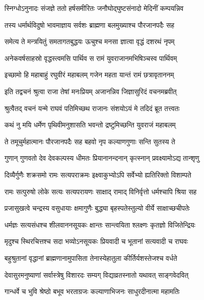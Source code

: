 \twolineshloka
{स्निग्धोऽनुनादः संजज्ञे ततो हर्षसमीरितः}
{जनौघोद्घुष्टसंनादो मेदिनीं कम्पयन्निव} %

\twolineshloka
{तस्य धर्मार्थविदुषो भावमाज्ञाय सर्वशः}
{ब्राह्मणा बलमुख्याश्च पौरजानपदैः सह} %

\twolineshloka
{समेत्य ते मन्त्रयितुं समतागतबुद्धयः}
{ऊचुश्च मनसा ज्ञात्वा वृद्धं दशरथं नृपम्} %

\twolineshloka
{अनेकवर्षसाहस्रो वृद्धस्त्वमसि पार्थिव}
{स रामं युवराजानमभिषिञ्चस्व पार्थिवम्} %

\twolineshloka
{इच्छामो हि महाबाहुं रघुवीरं महाबलम्}
{गजेन महता यान्तं रामं छत्रावृताननम्} %

\twolineshloka
{इति तद्वचनं श्रुत्वा राजा तेषां मनःप्रियम्}
{अजानन्निव जिज्ञासुरिदं वचनमब्रवीत्} %

\twolineshloka
{श्रुत्वैतद् वचनं यन्मे राघवं पतिमिच्छथ}
{राजानः संशयोऽयं मे तदिदं ब्रूत तत्त्वतः} %

\twolineshloka
{कथं नु मयि धर्मेण पृथिवीमनुशासति}
{भवन्तो द्रष्टुमिच्छन्ति युवराजं महाबलम्} %

\twolineshloka
{ते तमूचुर्महात्मानः पौरजानपदैः सह}
{बहवो नृप कल्याणगुणाः सन्ति सुतस्य ते} %

\twolineshloka
{गुणान् गुणवतो देव देवकल्पस्य धीमतः}
{प्रियानानन्दनान् कृत्स्नान् प्रवक्ष्यामोऽद्य तान्शृणु} %

\twolineshloka
{दिव्यैर्गुणैः शक्रसमो रामः सत्यपराक्रमः}
{इक्ष्वाकुभ्योऽपि सर्वेभ्यो ह्यतिरिक्तो विशाम्पते} %

\twolineshloka
{रामः सत्पुरुषो लोके सत्यः सत्यपरायणः}
{साक्षाद् रामाद् विनिर्वृत्तो धर्मश्चापि श्रिया सह} %

\twolineshloka
{प्रजासुखत्वे चन्द्रस्य वसुधायाः क्षमागुणैः}
{बुद्ध्या बृहस्पतेस्तुल्यो वीर्ये साक्षाच्छचीपतेः} %

\twolineshloka
{धर्मज्ञः सत्यसंधश्च शीलवाननसूयकः}
{क्षान्तः सान्त्वयिता श्लक्ष्णः कृतज्ञो विजितेन्द्रियः} %

\twolineshloka
{मृदुश्च स्थिरचित्तश्च सदा भव्योऽनसूयकः}
{प्रियवादी च भूतानां सत्यवादी च राघवः} %

\twolineshloka
{बहुश्रुतानां वृद्धानां ब्राह्मणानामुपासिता}
{तेनास्येहातुला कीर्तिर्यशस्तेजश्च वर्धते} %

\twolineshloka
{देवासुरमनुष्याणां सर्वास्त्रेषु विशारदः}
{सम्यग् विद्याव्रतस्नातो यथावत् साङ्गवेदवित्} %

\twolineshloka
{गान्धर्वे च भुवि श्रेष्ठो बभूव भरताग्रजः}
{कल्याणाभिजनः साधुरदीनात्मा महामतिः} %

